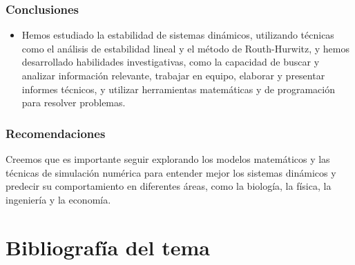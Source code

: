 \documentclass{beamer}
\begin{document}
\begin{frame}
	\frametitle{Conclusiones}
	\begin{minipage}{10cm}
		\begin{itemize}
			\item  Hemos estudiado
			la estabilidad de sistemas dinámicos, utilizando técnicas como el análisis de estabilidad lineal y el método de Routh-Hurwitz, y hemos
			desarrollado habilidades investigativas, como la capacidad de buscar y analizar información relevante, trabajar en equipo, elaborar y
			presentar informes técnicos, y utilizar herramientas matemáticas y de programación para resolver problemas.
		\end{itemize}	
	\end{minipage}
\end{frame}


\begin{frame}
	\frametitle{Recomendaciones}
	\begin{minipage}{10cm}
		Creemos que es importante seguir explorando los modelos matemáticos y las técnicas de simulación numérica para entender mejor
		los sistemas dinámicos y predecir su comportamiento en diferentes áreas, como la biología, la física, la ingeniería y
		la economía.
	\end{minipage}
\end{frame}
\section{Bibliograf\'ia del tema}
%
\end{document}
